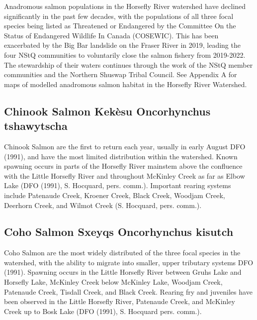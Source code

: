 \documentclass[
  letterpaper,
  DIV=11,
  numbers=noendperiod]{scrreprt}
\begin{document}
Anadromous salmon populations in the Horsefly River watershed have
declined significantly in the past few decades, with the populations of
all three focal species being listed as Threatened or Endangered by the
Committee On the Status of Endangered Wildlife In Canada (COSEWIC). This
has been exacerbated by the Big Bar landslide on the Fraser River in
2019, leading the four NStQ communities to voluntarily close the salmon
fishery from 2019-2022. The stewardship of their waters continues
through the work of the NStQ member communities and the Northern Shuswap
Tribal Council. See Appendix A for maps of modelled anadromous salmon
habitat in the Horsefly River Watershed.

\subsection*{Chinook Salmon \textbar{} Kekèsu \textbar{} Oncorhynchus
tshawytscha}\label{chinook-salmon-kekuxe8su-oncorhynchus-tshawytscha}

Chinook Salmon are the first to return each year, usually in early
August DFO (1991), and have the most limited distribution within the
watershed. Known spawning occurs in parts of the Horsefly River mainstem
above the confluence with the Little Horsefly River and throughout
McKinley Creek as far as Elbow Lake (DFO (1991), S. Hocquard, pers.
comm.). Important rearing systems include Patenaude Creek, Kroener
Creek, Black Creek, Woodjam Creek, Deerhorn Creek, and Wilmot Creek (S.
Hocquard, pers. comm.).

\subsection*{Coho Salmon \textbar{} Sxeyqs \textbar{} Oncorhynchus
kisutch}\label{coho-salmon-sxeyqs-oncorhynchus-kisutch}

Coho Salmon are the most widely distributed of the three focal species
in the watershed, with the ability to migrate into smaller, upper
tributary systems DFO (1991). Spawning occurs in the Little Horsefly
River between Gruhs Lake and Horsefly Lake, McKinley Creek below
McKinley Lake, Woodjam Creek, Patenaude Creek, Tisdall Creek, and Black
Creek. Rearing fry and juveniles have been observed in the Little
Horsefly River, Patenaude Creek, and McKinley Creek up to Bosk Lake (DFO
(1991), S. Hocquard pers. comm.).
\end{document}

